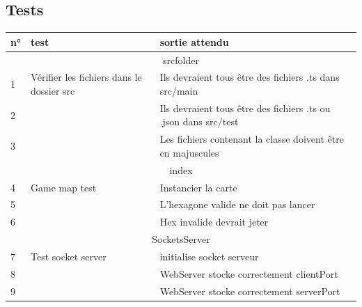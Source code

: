 \subsection{Tests}
\newpage


\begin{center}
    \begin{tabular}{|l|l|l|}
        \hline

        n° & test                                      & sortie attendu                                                    \\ \hline
        \multicolumn{3}{|c|}{srcfolder}                                                                                    \\
        \hline
        1  & Vérifier les fichiers dans le dossier src & Ils devraient tous être des fichiers .ts dans src/main            \\
        2  &                                           & Ils devraient tous être des fichiers .ts  ou  .json dans src/test \\
        3  &                                           & Les fichiers contenant la classe doivent être en majuscules       \\
        \hline
        \multicolumn{3}{|c|}{index}                                                                                        \\
        \hline
        4  & Game map test                             & Instancier la carte                                               \\
        5  &                                           & L'hexagone valide ne doit pas lancer                              \\
        6  &                                           & Hex invalide devrait jeter                                        \\
        \hline
        \multicolumn{3}{|c|}{SocketsServer}                                                                                \\
        \hline
        7  & Test socket server                        & initialise socket serveur                                         \\
        8  &                                           & WebServer stocke correctement clientPort                          \\
        9  &                                           & WebServer stocke correctement serverPort                          \\

\end{tabular}
\end{center}
